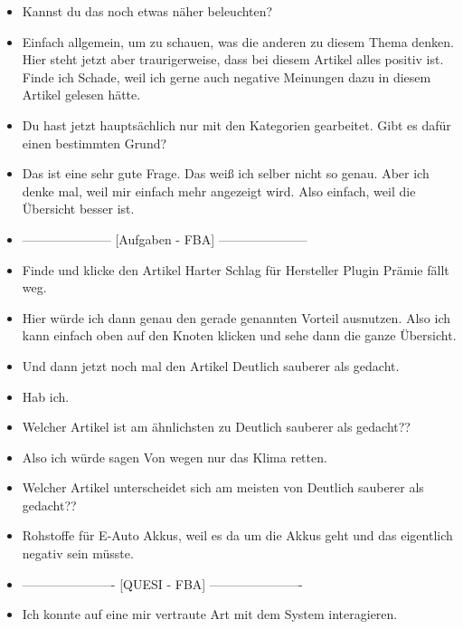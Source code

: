 {\begin{itemize}[]
                  Das klingt eigentlich ganz interessant.
            \item {} Kannst du das noch etwas näher beleuchten?
            \item {} Einfach allgemein, um zu schauen, was die anderen zu diesem Thema denken.
                  Hier steht jetzt aber traurigerweise, dass bei diesem Artikel alles positiv ist.
                  Finde ich Schade, weil ich gerne auch negative Meinungen dazu in diesem Artikel gelesen hätte.
            \item {} Du hast jetzt hauptsächlich nur mit den Kategorien gearbeitet.
                  Gibt es dafür einen bestimmten Grund?
            \item {} Das ist eine sehr gute Frage.
                  Das weiß ich selber nicht so genau.
                  Aber ich denke mal, weil mir einfach mehr angezeigt wird.
                  Also einfach, weil die Übersicht besser ist.
            \item {---------------------} [Aufgaben - FBA] {---------------------}
            \item {} Finde und klicke den Artikel \flqq Harter Schlag für Hersteller Plugin Prämie fällt weg\frqq{}.
            \item {} Hier würde ich dann genau den gerade genannten Vorteil ausnutzen.
                  Also ich kann einfach oben auf den Knoten klicken und sehe dann die ganze Übersicht.
            \item {} Und dann jetzt noch mal den Artikel \flqq Deutlich sauberer als gedacht\frqq{}.
            \item {} Hab ich.
            \item {} Welcher Artikel ist am ähnlichsten zu \flqq Deutlich sauberer als gedacht?\frqq{}?
            \item {} Also ich würde sagen \flqq Von wegen nur das Klima retten\frqq{}.
            \item {} Welcher Artikel unterscheidet sich am meisten von \flqq Deutlich sauberer als gedacht?\frqq{}?
            \item {} \flqq Rohstoffe für E-Auto Akkus\frqq{}, weil es da um die Akkus geht und das eigentlich negativ sein müsste.
            \item {----------------------} [QUESI - FBA] {----------------------}
            \item {} Ich konnte auf eine mir vertraute Art mit dem System interagieren.

\end{itemize}}
